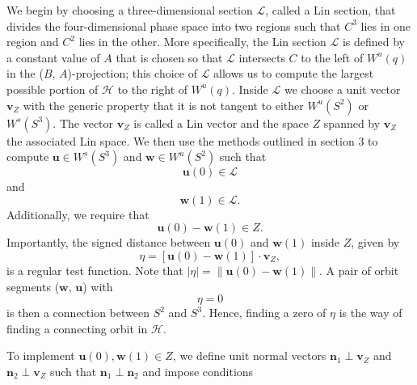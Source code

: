 \documentclass{ws-ijbc}
\begin{document}
We begin by choosing a three-dimensional section $\mathscr{L}$, called a Lin section, that divides the four-dimensional phase space into two regions such that $C^3$ lies in one region and $C^2$ lies in the other.  More specifically, the Lin section $\mathscr{L}$ is defined by a constant value of $A$ that is chosen so that $\mathscr{L}$ intersects $C$ to the left of $W^u(q)$ in the ($B$, $A$)-projection; this choice of $\mathscr{L}$ allows us to compute the largest possible portion of $\mathscr{H}$ to the right of $W^u(q)$.  Inside $\mathscr{L}$ we choose a unit vector $\mathbf{v}_Z$ with the generic property that it is not tangent to either $W^u(S^2)$ or $W^s(S^3)$.  The vector $\mathbf{v}_Z$ is called a Lin vector and the space $Z$ spanned by $\mathbf{v}_Z$ the associated Lin space.  We then use the methods outlined in section 3 to compute $\mathbf{u} \in W^s(S^3)$ and $\mathbf{w} \in W^u(S^2)$ such that
\begin{equation}
	\mathbf{u}(0) \in \mathscr{L}
	\label{general_conditions_heteroclinic_1}
\end{equation}
and
\begin{equation}	
	 \mathbf{w}(1) \in \mathscr{L}.
	 \label{general_conditions_heteroclinic_2}
\end{equation}
Additionally, we require that
\begin{equation*}
	\mathbf{u}(0)-\mathbf{w}(1) \in Z.
\end{equation*}
Importantly, the signed distance between $\mathbf{u}(0)$ and $\mathbf{w}(1)$ inside $Z$, given by
\begin{equation}
	\eta=[\mathbf{u}(0)-\mathbf{w}(1)] \cdot \mathbf{v}_Z,
	\label{general_conditions_heteroclinic_3}
\end{equation}
is a regular test function.  Note that $\left\lvert \eta \right\lvert = \left\lVert \mathbf{u}(0)-\mathbf{w}(1) \right\lVert$.  A pair of orbit segments ($\mathbf{w}$, $\mathbf{u}$) with 
\begin{equation}
	\eta = 0
	\label{general_conditions_heteroclinic_4}
\end{equation}
is then a connection between $S^2$ and $S^3$.  Hence, finding a zero of $\eta$ is the way of finding a connecting orbit in $\mathscr{H}$.

To implement $\mathbf{u}(0), \mathbf{w}(1) \in Z$, we define unit normal vectors $\mathbf{n}_1 \perp \mathbf{v}_Z$ and $\mathbf{n}_2 \perp \mathbf{v}_Z$ such that $\mathbf{n}_1 \perp \mathbf{n}_2$ and impose conditions
\end{document}
